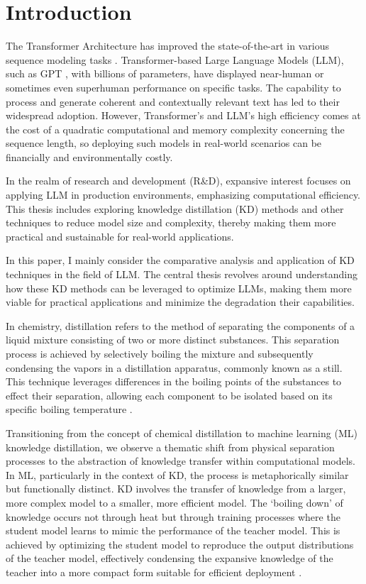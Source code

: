 \chapter{Introduction}
\label{chap:intro}

The Transformer Architecture has improved the state-of-the-art in various sequence modeling tasks \cite{attention}. Transformer-based Large Language Models (LLM), such as GPT \cite{gpt}, with billions of parameters, have displayed near-human or sometimes even superhuman performance on specific tasks. The capability to process and generate coherent and contextually relevant text has led to their widespread adoption. However, Transformer's and LLM's high efficiency comes at the cost of a quadratic computational and memory complexity concerning the sequence length, so deploying such models in real-world scenarios can be financially and environmentally costly.

In the realm of research and development (R\&D), expansive interest focuses on applying LLM in production environments, emphasizing computational efficiency. This thesis includes exploring knowledge distillation (KD) methods and other techniques to reduce model size and complexity, thereby making them more practical and sustainable for real-world applications.

In this paper, I mainly consider the comparative analysis and application of KD techniques in the field of LLM\@. The central thesis revolves around understanding how these KD methods can be leveraged to optimize LLMs, making them more viable for practical applications and minimize the degradation their capabilities.

In chemistry, distillation refers to the method of separating the components of a liquid mixture consisting of two or more distinct substances. This separation process is achieved by selectively boiling the mixture and subsequently condensing the vapors in a distillation apparatus, commonly known as a still. This technique leverages differences in the boiling points of the substances to effect their separation, allowing each component to be isolated based on its specific boiling temperature \cite{chem_distil}.

Transitioning from the concept of chemical distillation to machine learning (ML) knowledge distillation, we observe a thematic shift from physical separation processes to the abstraction of knowledge transfer within computational models. In ML, particularly in the context of KD, the process is metaphorically similar but functionally distinct. KD involves the transfer of knowledge from a larger, more complex model to a smaller, more efficient model. The `boiling down' of knowledge occurs not through heat but through training processes where the student model learns to mimic the performance of the teacher model. This is achieved by optimizing the student model to reproduce the output distributions of the teacher model, effectively condensing the expansive knowledge of the teacher into a more compact form suitable for efficient deployment \cite{distilling}.


